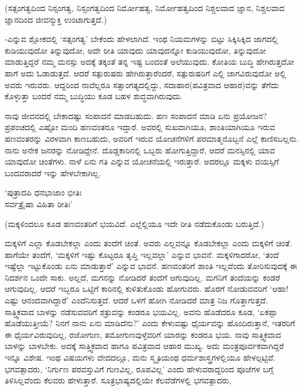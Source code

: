 (ಸತ್ಸಂಗತ್ವದಿಂದ ನಿಸ್ಸಂಗತ್ವ, ನಿಸ್ಸಂಗತ್ವದಿಂದ ನಿರ್ಮೋಹತ್ವ, ನಿರ್ಮೋಹತ್ವದಿಂದ ನಿಶ್ಚಲವಾದ ಜ್ಞಾನ, ನಿಶ್ಚಲವಾದ ಜ್ಞಾನದಿಂದ ಜೀವನ್ಮುಕ್ತಿ ಉಂಟಾಗುತ್ತದೆ.)

-ಎನ್ನುವ ಶ್ಲೋಕದಲ್ಲಿ `ಸತ್ಸಂಗತ್ವ' ಬೇಕೆಂದು ಹೇಳಲಾಗಿದೆ. ಇಂಥ ನಿಯಮಗಳನ್ನು ಬಿಟ್ಟು  ಸಿಕ್ಕಿಸಿಕ್ಕಿದ ಜಾಗದಲ್ಲಿ ಕುಡಿಯುವುದೋ ತಿನ್ನುವುದೋ, ಅದೇ ರೀತಿ ಯಾವುದು ಯಾವುದನ್ನೋ ಕುಡಿಯುವುದೋ, ತಿನ್ನುವುದೋ ಮಾಡುತ್ತಿದ್ದರೆ ನಮ್ಮ ಮನಸ್ಸು ಅದಕ್ಕೆ ತಕ್ಕಂತೆ ತನ್ನ ಇಷ್ಟ ಬಂದಂತೆ ಅಲೆಯುವುದು. ಕೋತಿಯ ಬುದ್ಧಿ ಹೇಗಿರುತ್ತದೋ ಹಾಗೆ ಅದು ಓಡಾಡುತ್ತದೆ. ಆದರೆ ಸತ್ಪುರುಷರು ಹೇಗಿರುತ್ತಾರೆಂದರೆ, ಸತ್ಪುರುಷರಿಗೆ ಎಲ್ಲಿ ಜಾಗವಿರುವುದೋ ಅಲ್ಲಿ ಅವರು ಇರುವರು. ಆದ್ದರಿಂದ ನಾವೆಲ್ಲರೂ ಸತ್ಸಾಂಗತ್ಯದಲ್ಲಿದ್ದು, ಸದಾಹಾರ(ಪವಿತ್ರವಾದ ಆಹಾರ)ವನ್ನು ತೆಗೆದು ಕೊಳ್ಳುತ್ತಾ ಬಂದರೆ ನಮ್ಮ ಬುದ್ಧಿಯು ಕೂಡ ಬಹಳ ಶುದ್ಧವಾಗಿರುವುದು.

ನಾವು ಜೀವನದಲ್ಲಿ ಬೇಕಾದಷ್ಟು ಸಂಪಾದನೆ ಮಾಡಬಹುದು. ಹಣ ಸಂಪಾದನೆ ಮಾಡಿ ಏನು ಪ್ರಯೋಜನ? ಪ್ರಪಂಚದಲ್ಲಿ ಎಷ್ಟೋ ಮಂದಿ ಹಣವಂತರೂ ಇದ್ದಾರೆ. ಅವರಲ್ಲಿ ಸುಖವಾಗಿಯೂ, ಶಾಂತಿಯಾಗಿಯೂ ಇರುವ ಹಣವಂತರನ್ನು ವಿರಳವಾಗಿ ಕಾಣಬಹುದು, ಅವರಿಗೆ ಇರುವ ಯೋಚನೆಗಳಿಗೆ ಪರಮಾತ್ಮನೊಬ್ಬನೆ ಎಲ್ಲೆ ಕಾಣಿಸಬಲ್ಲನು. ನಾನು ಅನೇಕ ಜನರನ್ನು ನೋಡಿದ್ದೇನೆ. ದೊಡ್ಡಕಾರಿನಲ್ಲಿ ಒಬ್ಬರು ಹೋಗುತ್ತಿದ್ದಾರೆ, ಆದರೆ ಮನಸ್ಸಿನಲ್ಲಿ ಯಾವ ಯಾವುದೋ ಚಿಂತೆಗಳು. ನಾಳೆ ಏನು ಗತಿ ಎನ್ನುವ ಯೋಚನೆಯಲ್ಲಿ ಇರುತ್ತಾರೆ. ಅದರಲ್ಲೂ ಮಕ್ಕಳು ವಯಸ್ಸಿಗೆ ಬಂದವರಾದರೆ ಇನ್ನು ಹೇಳಬೇಕಾಗಿಲ್ಲ.

\begin{shloka}
`ಪುತ್ರಾದಪಿ ಧನಭಾಜಾಂ ಭೀತಿಃ\\
ಸರ್ವತ್ರೈಷಾ ವಿಹಿತಾ ರೀತಿಃ'
\end{shloka}

(ಮಕ್ಕಳಿಂದಲೂ ಕೂಡ ಹಣವಂತರಿಗೆ ಭಯವಿದೆ. ಎಲ್ಲೆಲ್ಲಿಯೂ ಇದೇ ರೀತಿ ನಡೆದುಕೊಂಡು ಬರುತ್ತಿದೆ.)

ಮಕ್ಕಳಿಗೆ ಎಲ್ಲಾ ಕೊಡಬೇಕಲ್ಲಾ ಎಂದು ತಂದೆಗೆ ಚಿಂತೆ. ಅವರು ಎಲ್ಲವನ್ನೂ ಕೊಡಬೇಕಲ್ಲಾ ಎಂದು ಮಕ್ಕಳಿಗೆ ಚಿಂತೆ. ಹಾಗೆಯೇ ತಂದೆಗೆ, `ಮಕ್ಕಳಿಗೆ ಇಷ್ಟು ಕೊಟ್ಟರೂ ತೃಪ್ತಿ ಇಲ್ಲವಲ್ಲಾ' ಎನ್ನುವ ಭಾವನೆ. ಮಕ್ಕಳಿಗಾದರೋ, `ತಂದೆ ಇಷ್ಟೆಲ್ಲಾ ಇಟ್ಟುಕೊಂಡು ಏನು ಮಾಡುತ್ತಾರೆ' ಎನ್ನುವ ಭಾವನೆ. ಹಣವಂತರಿಗೆ ಶಾಂತಿ ಇಲ್ಲವೆಂದು ತೋರಿಸುವುದಕ್ಕೆ ಈ ನಿದರ್ಶನ ಒಂದೇ ಸಾಕು. ಅಲ್ಲದೆ, ಮಗನನ್ನು ನೋಡಿದರೆ ತಂದೆಗೆ ಆಗುವುದಿಲ್ಲ. ಮಗನಿಗೆ ತಂದೆಯನ್ನು ಕಂಡರೆ ಆಗುವುದಿಲ್ಲ. ಆದರೆ ಇಬ್ಬರೂ ಒಟ್ಟಿಗೆ ಕಾರಿನಲ್ಲಿ ಕುಳಿತುಕೊಂಡು ಹೋಗುವರು. ಹೊರಗೆ ನೋಡುವವರಿಗೆ `ಆಹಾ! ಎಷ್ಟು ಆನಂದವಾಗಿದ್ದಾರೆ' ಎಂದೆನಿಸುತ್ತದೆ. ಆದರೆ ಒಳಗೆ ಹೋಗಿ ನೋಡಿದರೆ ಮಾತ್ರ ನಿಜ ಗೊತ್ತಾಗುತ್ತದೆ. ಸಾತ್ತ್ವಿಕವಾದ ಬಾಳನ್ನು ನಡೆಸುವವರಿಗೆ ಶತ್ರುವನ್ನು ಕಂಡರೂ ಭಯವಿಲ್ಲ. ಅವನು ಹೊಡೆದರೂ ಕೂಡ, `ಏಕಪ್ಪಾ ಹೊಡೆಯುತ್ತೀಯೆ? ನಿನಗೆ ನಾನು ಏನು ಮಾಡಿದೆನು?' ಎಂದು ಕೇಳುವಷ್ಟು ಧೈರ್ಯವನ್ನು ಹೊಂದಿರುತ್ತಾನೆ, ಇತರರಿಗೆ ಈ ಧೈರ್ಯವಿರುವುದಿಲ್ಲ, ರಜೋಗುಣ, ತಮೋಗುಣವುಳ್ಳೆವರಿಗೆ ಯಾರನ್ನು ಕಂಡರೂ ಭಯ. ನಾವು ಸಾತ್ತ್ವಿಕವಾದ ಬಾಳನ್ನು ಬಾಳಬೇಕು. ಅದಕ್ಕೆ ಸಾತ್ತ್ವಿಕವಾದ ಹಾಗೂ ಪವಿತ್ರವಾದ ಆಹಾರ ಮುಖ್ಯ. ಅದು ಮಂತ್ರಪೂರ್ವಕವಾಗಿದ್ದರೆ ಇನ್ನೂ ವಿಶೇಷ. ಇಂಥ ವಿಷಯಗಳು ವೇದದಲ್ಲೂ, ಮನು ಸ್ಮೃತಿಯಂಥ ಧರ್ಮಶಾಸ್ತ್ರಗಳಲ್ಲಿಯೂ ಹೇಳಲ್ಪಟ್ಟಿವೆ. ಭಗವತ್ಪಾದರು, `ನಿರ್ಗುಣ ಪರವಸ್ತುವಿಗೆ ಗುಣವಿಲ್ಲ, ರೂಪವಿಲ್ಲ' ಎಂದು ಹೇಳುವರಾದ್ದರಿಂದ ಪೂಜೆಗಳ ಬಗ್ಗೆ ತಿಳಿಸಿಲ್ಲವೆಂದು ಕೆಲವರು ಹೇಳುತ್ತಾರೆ. ಸೂತ್ರಭಾಷ್ಯದಲ್ಲಿಯೇ ಕೆಲವೆಡೆಗಳಲ್ಲಿ ಭಗವತ್ಪಾದರು,

